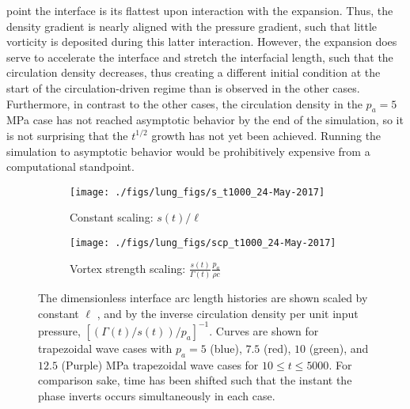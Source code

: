 \documentclass{jfm}%
\begin{document}
point the interface is its flattest upon interaction with the
expansion. Thus, the density gradient is nearly aligned with the
pressure gradient, such that little vorticity is deposited during this
latter interaction. However, the expansion does serve to accelerate
the interface and stretch the interfacial length, such that the
circulation density decreases, thus creating a different initial
condition at the start of the circulation-driven regime than is
observed in the other cases. Furthermore, in contrast to the other
cases, the circulation density in the $p_a = 5$ MPa case has not reached
asymptotic behavior by the end of the simulation, so it is not
surprising that the $t^{1/2}$ growth has not yet been
achieved. Running the simulation to asymptotic behavior would be
prohibitively expensive from a computational standpoint.%
%
\begin{figure}
  \centering
  \begin{subfigure}{0.45\textwidth}
    \texttt{[image: ./figs/lung\_figs/s\_t1000\_24-May-2017]}
    \caption{\label{fig:trapz_scp_t1000_unscaled} Constant scaling: $s(t)/\ell$}
  \end{subfigure}
  \begin{subfigure}{0.45\textwidth}
    \texttt{[image: ./figs/lung\_figs/scp\_t1000\_24-May-2017]}
    \caption{\label{fig:trapz_scp_t1000_scaled} Vortex strength scaling: $\frac{s(t)}{\Gamma(t)} \frac{p_a}{\rho c}$}
  \end{subfigure}
  \caption[The interface arc length at long times]{The dimensionless
    interface arc length histories are shown scaled by constant $\ell$
    , and by the inverse
    circulation density per unit input pressure,
    $[(\Gamma(t)/s(t))/p_a]^{-1}$. Curves are shown for trapezoidal
    wave cases with $p_a = 5$ (blue), $7.5$ (red), $10$ (green), and
    $12.5$ (Purple) MPa trapezoidal wave cases for
    $10\leq t\leq 5000$. For comparison sake, time has been shifted
    such that the instant the phase inverts occurs simultaneously in
    each case.}
  \label{fig:trapz_scp_t1000}
\end{figure}
% 
\end{document}
